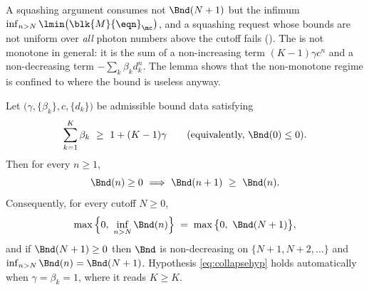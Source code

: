 
A squashing argument consumes not $\Bnd(N+1)$ but the infimum
$\inf_{n>N}\lmin\big(\blk{M}{\eqn}_{\mc}\big)$, and a squashing request whose
bounds are not uniform over \emph{all} photon numbers above the cutoff
fails (). The
 is not monotone in general: it is the sum of a
non-increasing term $(K-1)\gamma c^n$ and a non-decreasing term
$-\sum_k\beta_kd_k^n$. The lemma shows that the non-monotone regime is
confined to where the bound is useless anyway.

\begin{lemma}\label{lem:collapse}
Let $\big(\gamma,\{\beta_k\},c,\{d_k\}\big)$ be admissible bound data
satisfying
\begin{equation}\label{eq:collapsehyp}
  \sum_{k=1}^{K}\beta_k\ \ge\ 1+(K-1)\gamma
  \qquad\text{(equivalently, }\Bnd(0)\le0\text{)}.
\end{equation}
Then for every $n\ge1$,
\begin{equation}\label{eq:collapsestep}
  \Bnd(n)\ge0\ \Longrightarrow\ \Bnd(n+1)\ \ge\ \Bnd(n) .
\end{equation}
Consequently, for every cutoff $N\ge0$,
\begin{equation}\label{eq:collapseinf}
  \max\Big\{0,\ \inf_{n>N}\Bnd(n)\Big\}\;=\;\max\big\{0,\ \Bnd(N+1)\big\} ,
\end{equation}
and if $\Bnd(N+1)\ge0$ then $\Bnd$ is non-decreasing on $\{N+1,N+2,\dots\}$ and
$\inf_{n>N}\Bnd(n)=\Bnd(N+1)$. Hypothesis \eqref{eq:collapsehyp} holds
automatically when $\gamma=\beta_k=1$, where it reads $K\ge K$.
\end{lemma}

